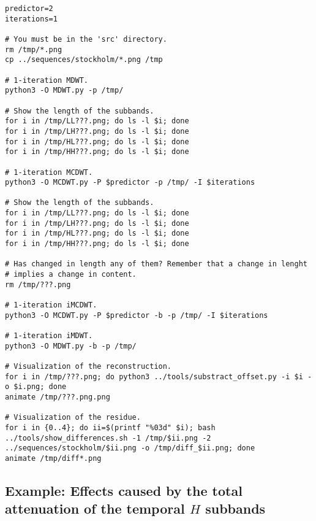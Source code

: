 \begin{verbatim}
predictor=2
iterations=1

# You must be in the 'src' directory.
rm /tmp/*.png
cp ../sequences/stockholm/*.png /tmp

# 1-iteration MDWT.
python3 -O MDWT.py -p /tmp/

# Show the length of the subbands.
for i in /tmp/LL???.png; do ls -l $i; done
for i in /tmp/LH???.png; do ls -l $i; done
for i in /tmp/HL???.png; do ls -l $i; done
for i in /tmp/HH???.png; do ls -l $i; done

# 1-iteration MCDWT.
python3 -O MCDWT.py -P $predictor -p /tmp/ -I $iterations

# Show the length of the subbands.
for i in /tmp/LL???.png; do ls -l $i; done
for i in /tmp/LH???.png; do ls -l $i; done
for i in /tmp/HL???.png; do ls -l $i; done
for i in /tmp/HH???.png; do ls -l $i; done

# Has changed in length any of them? Remember that a change in lenght
# implies a change in content.
rm /tmp/???.png

# 1-iteration iMCDWT.
python3 -O MCDWT.py -P $predictor -b -p /tmp/ -I $iterations

# 1-iteration iMDWT.
python3 -O MDWT.py -b -p /tmp/

# Visualization of the reconstruction.
for i in /tmp/???.png; do python3 ../tools/substract_offset.py -i $i -o $i.png; done
animate /tmp/???.png.png

# Visualization of the residue.
for i in {0..4}; do ii=$(printf "%03d" $i); bash ../tools/show_differences.sh -1 /tmp/$ii.png -2 ../sequences/stockholm/$ii.png -o /tmp/diff_$ii.png; done
animate /tmp/diff*.png
\end{verbatim}

\subsection*{Example: Effects caused by the total attenuation of the temporal $H$ subbands}


